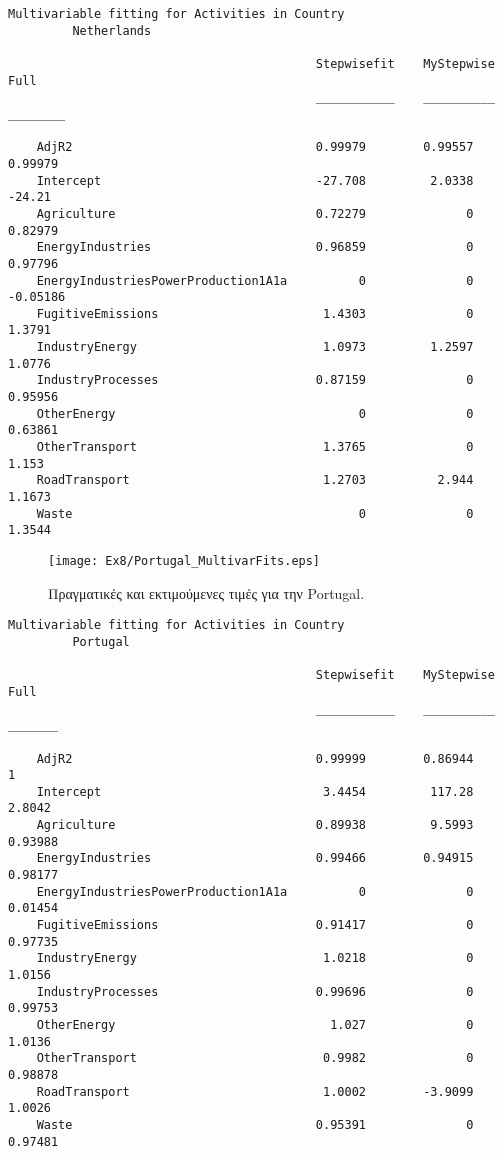 \documentclass[11pt]{scrartcl} %
\begin{document}
\begin{Verbatim}[fontsize=\small]
Multivariable fitting for Activities in Country
 	 	 Netherlands

                                           Stepwisefit    MyStepwise      Full  
                                           ___________    __________    ________

    AdjR2                                  0.99979        0.99557        0.99979
    Intercept                              -27.708         2.0338         -24.21
    Agriculture                            0.72279              0        0.82979
    EnergyIndustries                       0.96859              0        0.97796
    EnergyIndustriesPowerProduction1A1a          0              0       -0.05186
    FugitiveEmissions                       1.4303              0         1.3791
    IndustryEnergy                          1.0973         1.2597         1.0776
    IndustryProcesses                      0.87159              0        0.95956
    OtherEnergy                                  0              0        0.63861
    OtherTransport                          1.3765              0          1.153
    RoadTransport                           1.2703          2.944         1.1673
    Waste                                        0              0         1.3544
\end{Verbatim}



\begin{figure}[H]

	\centering
	\texttt{[image: Ex8/Portugal\_MultivarFits.eps]}	
\caption{Πραγματικές και εκτιμούμενες τιμές για την Portugal.}
\label{fig:z812} 
\end{figure}



\begin{Verbatim}[fontsize=\small]
Multivariable fitting for Activities in Country
 	 	 Portugal

                                           Stepwisefit    MyStepwise     Full  
                                           ___________    __________    _______

    AdjR2                                  0.99999        0.86944             1
    Intercept                               3.4454         117.28        2.8042
    Agriculture                            0.89938         9.5993       0.93988
    EnergyIndustries                       0.99466        0.94915       0.98177
    EnergyIndustriesPowerProduction1A1a          0              0       0.01454
    FugitiveEmissions                      0.91417              0       0.97735
    IndustryEnergy                          1.0218              0        1.0156
    IndustryProcesses                      0.99696              0       0.99753
    OtherEnergy                              1.027              0        1.0136
    OtherTransport                          0.9982              0       0.98878
    RoadTransport                           1.0002        -3.9099        1.0026
    Waste                                  0.95391              0       0.97481
\end{Verbatim}
\end{document}
